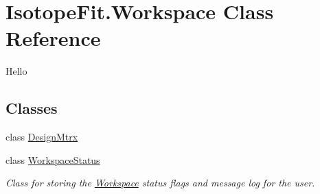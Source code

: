 \hypertarget{class_isotope_fit_1_1_workspace}{}\section{Isotope\+Fit.\+Workspace Class Reference}
\label{class_isotope_fit_1_1_workspace}


Hello  


\subsection*{Classes}
\begin{DoxyCompactItemize}
\item 
class \hyperlink{class_isotope_fit_1_1_workspace_1_1_design_mtrx}{Design\+Mtrx}
\item 
class \hyperlink{class_isotope_fit_1_1_workspace_1_1_workspace_status}{Workspace\+Status}
\begin{DoxyCompactList}\small\item\em Class for storing the \hyperlink{class_isotope_fit_1_1_workspace}{Workspace} status flags and message log for the user. \end{DoxyCompactList}\end{DoxyCompactItemize}
